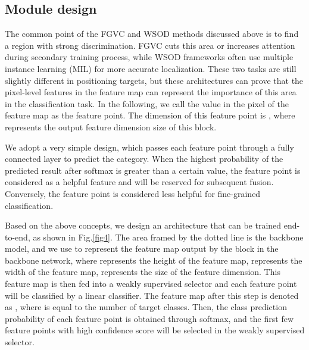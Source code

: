 \documentclass[conference]{IEEEtran}
\begin{document}
\subsection{Module design}
The common point of the FGVC and WSOD methods discussed above is to find a region with strong discrimination. FGVC cuts this area or increases attention during secondary training process, while WSOD frameworks often use multiple instance learning (MIL) for more accurate localization. These two tasks are still slightly different in positioning targets, but these architectures can prove that the pixel-level features in the feature map can represent the importance of this area in the classification task. In the following, we call the value in the pixel of the feature map as the feature point. The dimension of this feature point is , where  represents the output feature dimension size of this block.

We adopt a very simple design, which passes each feature point through a fully connected layer to predict the category. When the highest probability of the predicted result after softmax is greater than a certain value, the feature point is considered as a helpful feature and will be reserved for subsequent fusion. Conversely, the feature point is considered less helpful for fine-grained classification.

Based on the above concepts, we design an architecture that can be trained end-to-end, as shown in Fig.\ref{fig4}. The area framed by the dotted line is the backbone model, and we use  to represent the feature map output by the  block in the backbone network, where  represents the height of the feature map,  represents the width of the feature map,  represents the size of the feature dimension. This feature map is then fed into a weakly supervised selector and each feature point will be classified by a linear classifier. The feature map after this step is denoted as , where  is equal to the number of target classes. Then, the class prediction probability of each feature point is obtained through softmax, and the first few feature points with high confidence score will be selected in the weakly supervised selector.
\end{document}
